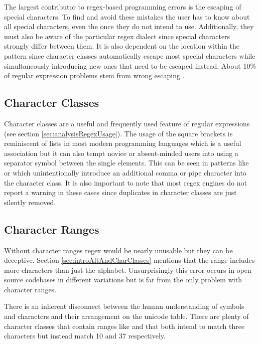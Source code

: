 The largest contributor to regex-based programming errors is the escaping of special characters. To find and avoid these mistakes the user has to know about all special characters, even the once they do not intend to use. Additionally, they must also be aware of the particular regex dialect since special characters strongly differ between them. It is also dependent on the location within the pattern since character classes automatically escape most special characters while simultaneously introducing new ones that need to be escaped instead. About 10\% of regular expression problems stem from wrong escaping \cite{DemystifyingRegexBugs}. 

\subsection{Character Classes}

Character classes are a useful and frequently used feature of regular expressions (see section \ref{sec:analysisRegexUsage}). The usage of the square brackets is reminiscent of lists in most modern programming languages which is a useful association but it can also tempt novice or absent-minded users into using a separator symbol between the single elements. This can be seen in patterns like \pattern{[0,2,3,5-9]} \cite{RegexErrorNlpChinaCharClassSep} or \pattern{[3|4|5|7|8]} \cite{RegexErrorRoncooCharClassSep} which unintentionally introduce an additional comma or pipe character into the character class. It is also important to note that most regex engines do not report a warning in these cases since duplicates in character classes are just silently removed.

\subsection{Character Ranges}

Without character ranges regex would be nearly unusable but they can be deceptive. Section \ref{sec:introAltAndCharClasses} mentions that the range \pattern{[A-z]} includes more characters than just the alphabet. Unsurprisingly this error occurs in open source codebases in different variations \cite{RegexErrorCamelLetterRange}\cite{RegexErrorApacheGeodeLetterRange}\cite{RegexErrorElasticSearchLetterRange} but is far from the only problem with character ranges.

There is an inherent disconnect between the human understanding of symbols and characters and their arrangement on the unicode table. There are plenty of character classes that contain ranges like \pattern{[\%-.]} \cite{RegexErrorJenkinsSpecialRange} and \pattern{[;-\_]} \cite{RegexErrorQuizconnectSpecialRange} that both intend to match three characters but instead match 10 and 37 respectively.

